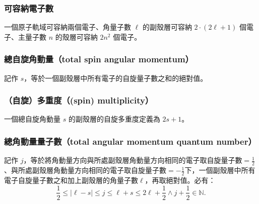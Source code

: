 \documentclass[a4paper,12pt]{report}
\begin{document}
\subsubsection{可容納電子數}
一個原子軌域可容納兩個電子、角量子數 $\ell$ 的副殼層可容納 $2\cdot(2\ell+1)$ 個電子、主量子數 $n$ 的殼層可容納 $2n^2$ 個電子。
\subsubsection{總自旋角動量（total spin angular momentum）}
記作 $s$，等於一個副殼層中所有電子的自旋量子數之和的絕對值。
\subsubsection{（自旋）多重度（(spin) multiplicity）}
一個總自旋角動量 $s$ 的副殼層的自旋多重度定義為 $2s+1$。
\subsubsection{總角動量量子數（total angular momentum quantum number）}
記作 $j$，等於將角動量方向與所處副殼層角動量方向相同的電子取自旋量子數$=\frac{1}{2}$、與所處副殼層角動量方向相同的電子取自旋量子數$=-\frac{1}{2}$下，一個副殼層中所有電子自旋量子數之和加上副殼層的角量子數$\ell$，再取絕對值。必有：
\[\frac{1}{2}\leq |\ell-s|\leq j\leq \ell+s\leq 2\ell+\frac{1}{2}\land j+\frac{1}{2}\in\mathbb{N}.\]
\end{document}
